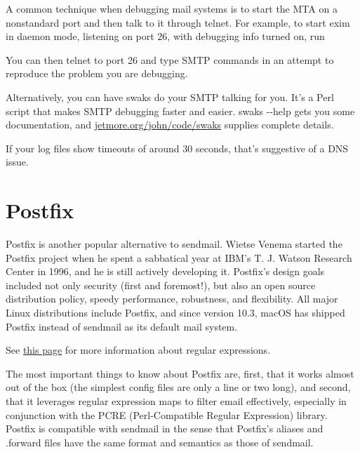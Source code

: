 A common technique when debugging mail systems is to start the MTA on a
nonstandard port and then talk to it through {telnet}. For example, to
start {exim} in daemon mode, listening on port 26, with debugging info
turned on, run


You can then {telnet} to port 26 and type SMTP commands in an attempt to
reproduce the problem you are debugging.

Alternatively, you can have {swaks} do your SMTP talking for you. It's a
Perl script that makes SMTP debugging faster and easier. {swaks
-\/-help} gets you some documentation, and
\href{http://jetmore.org/john/code/swaks}{jetmore.org/john/code/swaks}
supplies complete details.

If your log files show timeouts of around 30 seconds, that's suggestive
of a DNS issue.


\section{Postfix}

\protect\hypertarget{part0026_split_057.htmlux5cux23_idIndexMarker2678}{}{}Postfix
is another popular alternative to {sendmail}.
\protect\hypertarget{part0026_split_057.htmlux5cux23_idIndexMarker2679}{}{}Wietse
Venema started the Postfix project when he spent a sabbatical year at
\protect\hypertarget{part0026_split_057.htmlux5cux23_idIndexMarker2680}{}{}IBM's
T. J. Watson Research Center in 1996, and he is still actively
developing it. Postfix's design goals included not only security (first
and foremost!), but also an open source distribution policy, speedy
performance, robustness, and flexibility. All major Linux distributions
include Postfix, and since version 10.3, macOS has shipped Postfix
instead of {sendmail} as its default mail system.

\leavevmode\hypertarget{part0026_split_057.htmlux5cux23_idContainer1213}{}%
See
\protect\hyperlink{part0014_split_023.htmlux5cux23_idTextAnchor367}{this
page} for more information about regular expressions.

The most important things to know about Postfix are, first, that it
works almost out of the box (the simplest config files are only a line
or two long), and second, that it leverages regular expression maps to
filter email effectively, especially in conjunction with the
\protect\hypertarget{part0026_split_057.htmlux5cux23_idIndexMarker2681}{}{}PCRE
(Perl-Compatible Regular Expression) library. Postfix is compatible with
{sendmail} in the sense that Postfix's {aliases} and {.forward} files
have the same format and semantics as those of {sendmail}.

